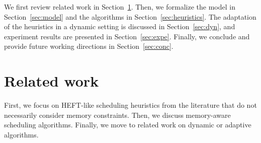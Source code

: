 \documentclass[conference]{IEEEtran}
\newcommand{\skug}[1]{{\color{blue}[SK: #1]}}
\newcommand{\hmey}[1]{{\color{red}[HM: #1]}}
\begin{document}
We first review related work in Section~\ref{sec:related-work}. Then, we formalize the model in Section~\ref{sec:model}
and the algorithms in Section~\ref{sec:heuristics}. The adaptation of the heuristics in a dynamic setting is discussed in Section~\ref{sec:dyn}, and experiment results are presented in Section~\ref{sec:expe}. Finally, we conclude
and provide future working directions in Section~\ref{sec:conc}.  






\section{Related work} %
    \label{sec:related-work}
   
   First, we focus on HEFT-like scheduling heuristics from the literature  that do not necessarily  
   consider memory constraints. Then, we discuss memory-aware scheduling algorithms. 
   Finally, we move to related work on dynamic or adaptive algorithms. 
\end{document}
